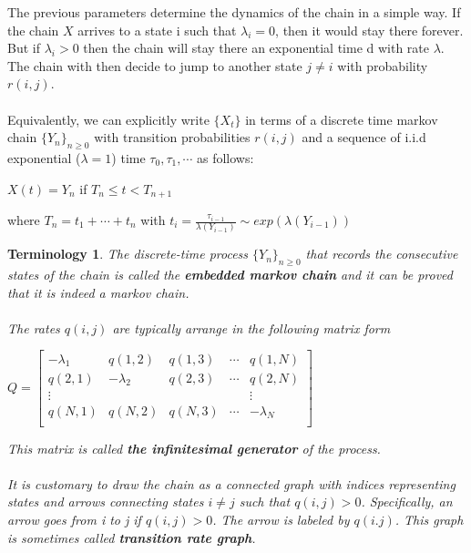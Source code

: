 \documentclass[12pt]{article}
\newtheorem{terminology}{Terminology}
\begin{document}
The previous parameters determine the dynamics of the chain in a simple way. If the chain $X$ arrives to a state i such that $\lambda_i = 0$, then it would stay there forever. But if $\lambda_i > 0$ then the chain will stay there an exponential time d with rate $\lambda$. The chain with then decide to jump to another state $j \ne i$ with probability $r(i,j)$.
\\
\\Equivalently, we can explicitly write $\{X_t\}$ in terms of a discrete time markov chain $\{Y_n\}_{n\geq0}$ with transition probabilities $r(i,j)$ and a sequence of i.i.d exponential ($\lambda = 1$) time $\tau _0, \tau _1, \cdots$ as follows:

\begin{center}
    $X(t) = Y_n$ if $T_n \leq t < T_{n+1}$
\end{center}

where $T_n = t_1 + \cdots + t_n$ with $t_i = \frac{\tau_{i-1}}{\lambda(Y_{i-1})} \sim exp(\lambda(Y_{i-1}))$

\begin{terminology}
    The discrete-time process $\{Y_n\}_{n\geq0}$ that records the consecutive states of the chain is called the \textbf{embedded markov chain} and it can be proved that it is indeed a markov chain.
    \\
    \\The rates $q(i,j)$ are typically arrange in the following matrix form
    \begin{center}
        $Q = \begin{bmatrix}
         -\lambda _1 & q(1,2) & q(1,3) & \cdots & q(1,N)\\
         q(2,1) & -\lambda _2 & q(2,3) & \cdots & q(2,N)\\
         \vdots &  &  & & \vdots \\
         q(N,1) & q(N,2) & q(N,3) & \cdots & -\lambda _N\\
        \end{bmatrix}$
    \end{center}
    This matrix is called \textbf{the infinitesimal generator} of the process.
    \\
    \\It is customary to draw the chain as a connected graph with indices representing states and arrows connecting states $i \ne j$ such that $q(i,j) > 0$. Specifically, an arrow goes from i to j if $q(i,j) > 0$. The arrow is labeled by $q(i.j)$. This graph is sometimes called \textbf{transition rate graph}.
\end{terminology}
\end{document}
